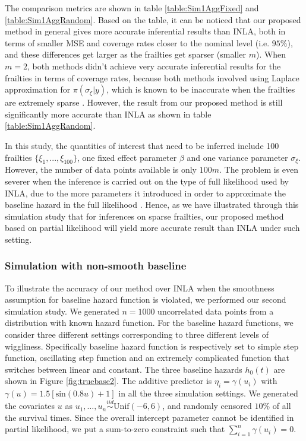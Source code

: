 \documentclass[ba]{imsart}
\begin{document}
The comparison metrics are shown in table \ref{table:Sim1AggFixed} and \ref{table:Sim1AggRandom}. Based on the table, it can be noticed that our proposed method in general gives more accurate inferential results than INLA, both in terms of smaller MSE and coverage rates closer to the nominal level (i.e. $95\%$), and these differences get larger as the frailties get sparser (smaller $m$). When $m = 2$, both methods didn't achieve very accurate inferential results for the frailties in terms of coverage rates, because both methods involved using Laplace approximation for $\pi(\sigma_\xi|y)$, which is known to be inaccurate when the frailties are extremely sparse \citep{Ogden2013ASR}. However, the result from our proposed method is still significantly more accurate than INLA as shown in table \ref{table:Sim1AggRandom}.

In this study, the quantities of interest that need to be inferred include 100 frailties $\{\xi_1,...,\xi_{100}\}$, one fixed effect parameter $\beta$ and one variance parameter $\sigma_\xi$. However, the number of data points available is only $100m$. The problem is even severer when the inference is carried out on the type of full likelihood used by INLA, due to the more parameters it introduced in order to approximate the baseline hazard in the full likelihood \citep{coxdiscussion}. Hence, as we have illustrated through this simulation study that for inferences on sparse frailties, our proposed method based on partial likelihood will yield more accurate result than INLA under such setting.

\subsubsection{Simulation with non-smooth baseline}\label{subsubsec:sim2}

To illustrate the accuracy of our method over INLA when the smoothness assumption for baseline hazard function is violated, we performed our second simulation study. We generated $n = 1000$ uncorrelated data points from a distribution with known hazard function. For the baseline hazard functions, we consider three different settings corresponding to three different levels of wiggliness. Specifically baseline hazard function is respectively set to simple step function, oscillating step function and an extremely complicated function that switches between linear and constant. The three baseline hazards $h_{0}(t)$ are shown in Figure \ref{fig:truebase2}. The additive predictor is $\eta_{i} = \gamma\left(u_{i}\right)$ with $\gamma(u) = 1.5 [ \text{sin}(0.8u) + 1 ]$ in all the three simulation settings. We generated the covariates $u$ as  $u_{1},\ldots,u_{n}\overset{iid}{\sim}\text{Unif}(-6,6)$, and randomly censored $10\%$ of all the survival times. Since the overall intercept parameter cannot be identified in partial likelihood, we put a sum-to-zero constraint such that $\sum_{i=1}^{n} \gamma{(u_i)} = 0$.
\end{document}
